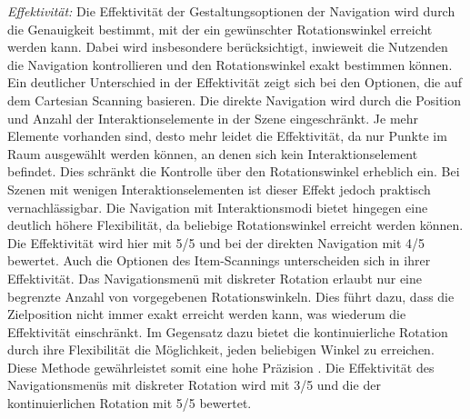 \textit{Effektivität:}
Die Effektivität der Gestaltungsoptionen der Navigation wird durch die Genauigkeit bestimmt, mit der ein gewünschter Rotationswinkel erreicht werden kann. Dabei wird insbesondere berücksichtigt, inwieweit die Nutzenden die Navigation kontrollieren und den Rotationswinkel exakt bestimmen können. 
Ein deutlicher Unterschied in der Effektivität zeigt sich bei den Optionen, die auf dem Cartesian Scanning basieren. Die direkte Navigation wird durch die Position und Anzahl der Interaktionselemente in der Szene eingeschränkt. Je mehr Elemente vorhanden sind, desto mehr leidet die Effektivität, da nur Punkte im Raum ausgewählt werden können, an denen sich kein Interaktionselement befindet. Dies schränkt die Kontrolle über den Rotationswinkel erheblich ein. Bei Szenen mit wenigen Interaktionselementen ist dieser Effekt jedoch praktisch vernachlässigbar. Die Navigation mit Interaktionsmodi bietet hingegen eine deutlich höhere Flexibilität, da beliebige Rotationswinkel erreicht werden können. Die Effektivität wird hier mit 5/5 und bei der direkten Navigation mit 4/5 bewertet.
Auch die Optionen des Item-Scannings unterscheiden sich in ihrer Effektivität. Das Navigationsmenü mit diskreter Rotation erlaubt nur eine begrenzte Anzahl von vorgegebenen Rotationswinkeln. Dies führt dazu, dass die Zielposition nicht immer exakt erreicht werden kann, was wiederum die Effektivität einschränkt. Im Gegensatz dazu bietet die kontinuierliche Rotation durch ihre Flexibilität die Möglichkeit, jeden beliebigen Winkel zu erreichen. Diese Methode gewährleistet somit eine hohe Präzision \citep{10.1145/2159365.2159386}. Die Effektivität des Navigationsmenüs mit diskreter Rotation wird mit 3/5 und die der kontinuierlichen Rotation mit 5/5 bewertet.

